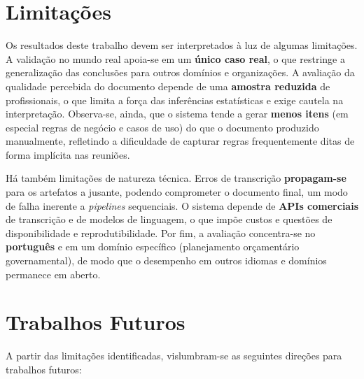 
\section{Limitações}

Os resultados deste trabalho devem ser interpretados à luz de algumas limitações. A validação no mundo real apoia-se em um \textbf{único caso real}, o que restringe a generalização das conclusões para outros domínios e organizações. A avaliação da qualidade percebida do documento depende de uma \textbf{amostra reduzida} de profissionais, o que limita a força das inferências estatísticas e exige cautela na interpretação. Observa-se, ainda, que o sistema tende a gerar \textbf{menos itens} (em especial regras de negócio e casos de uso) do que o documento produzido manualmente, refletindo a dificuldade de capturar regras frequentemente ditas de forma implícita nas reuniões.

Há também limitações de natureza técnica. Erros de transcrição \textbf{propagam-se} para os artefatos a jusante, podendo comprometer o documento final, um modo de falha inerente a \textit{pipelines} sequenciais. O sistema depende de \textbf{APIs comerciais} de transcrição e de modelos de linguagem, o que impõe custos e questões de disponibilidade e reprodutibilidade. Por fim, a avaliação concentra-se no \textbf{português} e em um domínio específico (planejamento orçamentário governamental), de modo que o desempenho em outros idiomas e domínios permanece em aberto.

\section{Trabalhos Futuros}

A partir das limitações identificadas, vislumbram-se as seguintes direções para trabalhos futuros:


